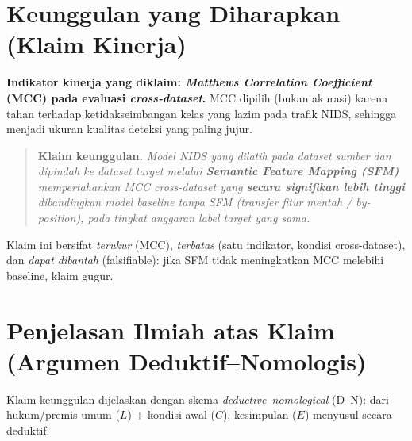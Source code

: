 \documentclass[11pt,a4paper]{article}
\begin{document}
\section{Keunggulan yang Diharapkan (Klaim Kinerja)}

\noindent\textbf{Indikator kinerja yang diklaim: \emph{Matthews Correlation
Coefficient} (MCC) pada evaluasi \emph{cross-dataset}.} MCC dipilih (bukan
akurasi) karena tahan terhadap ketidakseimbangan kelas yang lazim pada trafik
NIDS, sehingga menjadi ukuran kualitas deteksi yang paling jujur.

\begin{quote}
\textbf{Klaim keunggulan.} \emph{Model NIDS yang dilatih pada dataset sumber
dan dipindah ke dataset target melalui \textbf{Semantic Feature Mapping (SFM)}
mempertahankan MCC cross-dataset yang \textbf{secara signifikan lebih tinggi}
dibandingkan model baseline tanpa SFM (transfer fitur mentah / by-position),
pada tingkat anggaran label target yang sama.}
\end{quote}

\noindent Klaim ini bersifat \emph{terukur} (MCC), \emph{terbatas} (satu
indikator, kondisi cross-dataset), dan \emph{dapat dibantah} (falsifiable):
jika SFM tidak meningkatkan MCC melebihi baseline, klaim gugur.

\section{Penjelasan Ilmiah atas Klaim (Argumen Deduktif--Nomologis)}

Klaim keunggulan dijelaskan dengan skema \emph{deductive--nomological} (D--N):
dari hukum/premis umum ($L$) + kondisi awal ($C$), kesimpulan ($E$) menyusul
secara deduktif.
\end{document}
